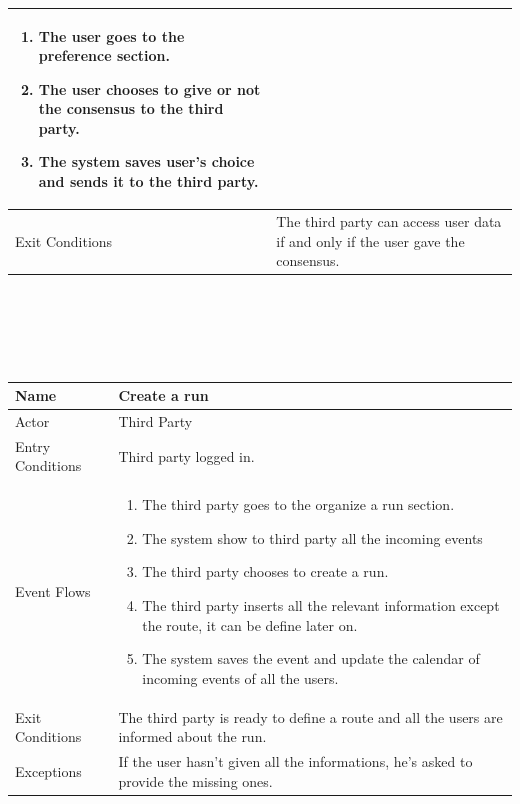 \documentclass{article}
\begin{document}
\begin{legal}
\begin{legal}
\begin{legal}
\begin{tabular}{| m{3.5cm} | m{8cm}| }
\begin{enumerate}
									\item The user goes to the preference section.
									\item The user chooses to give or not the consensus to the third party.
									\item The system saves user's choice and sends it to the third party.
				\end{enumerate}\\
				\hline
					Exit Conditions & The third party can access user data if and only if the user gave the consensus.\\
				\hline
				\end{tabular}\\
				\\\\\\
				\begin{tabular}{| m{3.5cm} | m{8cm}| }
				\hline
					Name & Create a run\\
				\hline
					Actor & Third Party\\
				\hline
					Entry Conditions & Third party logged in.\\
				\hline
					Event Flows & \begin{enumerate}
									\item The third party goes to the organize a run section.
									\item The system show to third party all the incoming events
									\item The third party chooses to create a run.
									\item The third party inserts all the relevant information except the route, it can be define later on.
									\item The system saves the event and update the calendar of incoming events of all the users.
				\end{enumerate}\\
				\hline
					Exit Conditions & The third party is ready to define a route and all the users are informed about the run.\\
				\hline 
					Exceptions & If the user hasn't given all the informations, he's asked to provide the missing ones.
					\\
				\hline
				\end{tabular}\\
				\\\\\\
				\begin{tabular}{| m{3.5cm} | m{8cm}| }

\end{tabular}
\end{legal}
\end{legal}
\end{legal}
\end{document}
